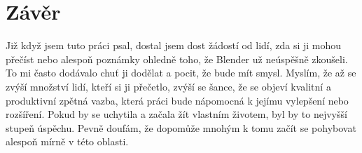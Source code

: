 \documentclass[12pt,a4paper]{report}
\begin{document}
	
	\chapter{Závěr}
	Již když jsem tuto práci psal, dostal jsem dost žádostí od lidí, zda si ji
	mohou přečíst nebo alespoň poznámky ohledně toho, že Blender už
	neúspěšně zkoušeli. To mi často dodávalo chuť ji dodělat a pocit, že bude
	mít smysl. Myslím, že až se zvýší množství lidí, kteří si ji přečetlo, zvýší se
	šance, že se objeví kvalitní a produktivní zpětná vazba, která práci bude
	nápomocná k jejímu vylepšení nebo rozšíření. Pokud by se uchytila a
	začala žít vlastním životem, byl by to nejvyšší stupeň úspěchu. Pevně
	doufám, že dopomůže mnohým k tomu začít se pohybovat alespoň mírně
	v této oblasti.
	
	
	

	
\end{document}
